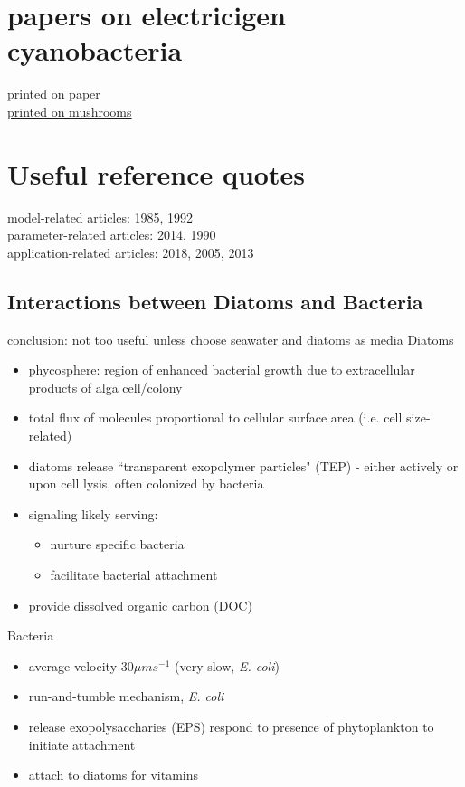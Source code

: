 \documentclass[a4paper,11pt]{article}
\begin{document}
    \section{papers on electricigen cyanobacteria}
    \href{https://www.nature.com/articles/s41467-017-01084-4/}{printed on paper}\\
    \href{sci-hub.se/10.1021/acs.nanolett.8b02642}{printed on mushrooms}
    
    \section{Useful reference quotes}
    model-related articles: 1985\autocite{bratbak1985phytoplankton}, 1992\autocite{sanders1992relationships}\\
    parameter-related articles: 2014\autocite{beliaev2014inference}, 1990\autocite{currie1990large}\\
    application-related articles: 2018\autocite{light2018flavin}, 2005\autocite{reguera2005extracellular}, 2013\autocite{xie2013microbial}

    \subsection{Interactions between Diatoms and Bacteria}
    conclusion\autocite{amin2012interactions}: not too useful unless choose seawater and diatoms as media
    Diatoms
    \begin{itemize}
        \item phycosphere: region of enhanced bacterial growth due to extracellular products of alga cell/colony
        \item total flux of molecules proportional to cellular surface area (i.e. cell size-related)
        \item diatoms release ``transparent exopolymer particles" (TEP) - either actively or upon cell lysis, often colonized by bacteria
        \item signaling likely serving:
        \begin{itemize}
            \item nurture specific bacteria
            \item facilitate bacterial attachment
        \end{itemize}
        \item provide dissolved organic carbon (DOC)
    \end{itemize}
    Bacteria
    \begin{itemize}
        \item average velocity 30$\mu ms^{-1}$ (very slow, \textit{E. coli})
        \item run-and-tumble mechanism, \textit{E. coli}
        \item release exopolysaccharies (EPS) respond to presence of phytoplankton to initiate attachment
        \item attach to diatoms for vitamins
    \end{itemize}
    
\end{document}
